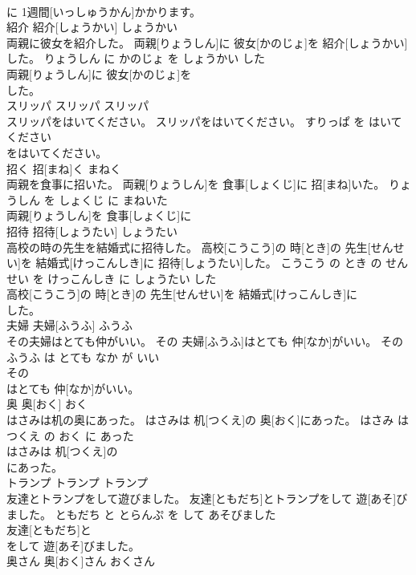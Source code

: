 \documentclass[8pt]{extreport}
\begin{document}
\begin{CJK}{UTF8}{min}
\\	に 1週間[いっしゅうかん]かかります。			
\\	紹介	紹介[しょうかい]	しょうかい	
\\	両親に彼女を紹介した。	両親[りょうしん]に 彼女[かのじょ]を 紹介[しょうかい]した。	りょうしん に かのじょ を しょうかい した	
\\	両親[りょうしん]に 彼女[かのじょ]を
\\	した。			
\\	スリッパ	スリッパ	スリッパ	
\\	スリッパをはいてください。	スリッパをはいてください。	すりっぱ を はいて ください	
\\	をはいてください。			
\\	招く	招[まね]く	まねく	
\\	両親を食事に招いた。	両親[りょうしん]を 食事[しょくじ]に 招[まね]いた。	りょうしん を しょくじ に まねいた	
\\	両親[りょうしん]を 食事[しょくじ]に
\\	招待	招待[しょうたい]	しょうたい	
\\	高校の時の先生を結婚式に招待した。	高校[こうこう]の 時[とき]の 先生[せんせい]を 結婚式[けっこんしき]に 招待[しょうたい]した。	こうこう の とき の せんせい を けっこんしき に しょうたい した	
\\	高校[こうこう]の 時[とき]の 先生[せんせい]を 結婚式[けっこんしき]に
\\	した。			
\\	夫婦	夫婦[ふうふ]	ふうふ	
\\	その夫婦はとても仲がいい。	その 夫婦[ふうふ]はとても 仲[なか]がいい。	その ふうふ は とても なか が いい	
\\	その
\\	はとても 仲[なか]がいい。			
\\	奥	奥[おく]	おく	
\\	はさみは机の奥にあった。	はさみは 机[つくえ]の 奥[おく]にあった。	はさみ は つくえ の おく に あった	
\\	はさみは 机[つくえ]の
\\	にあった。			
\\	トランプ	トランプ	トランプ	
\\	友達とトランプをして遊びました。	友達[ともだち]とトランプをして 遊[あそ]びました。	ともだち と とらんぷ を して あそびました	
\\	友達[ともだち]と
\\	をして 遊[あそ]びました。			
\\	奥さん	奥[おく]さん	おくさん	

\end{CJK}
\end{document}
